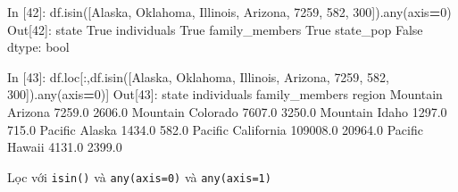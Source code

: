 \documentclass[
]{book}
\newenvironment{Shaded}{\begin{snugshade}}{\end{snugshade}}
\newcommand{\BuiltInTok}[1]{#1}
\newcommand{\DecValTok}[1]{\textcolor[rgb]{0.00,0.00,0.81}{#1}}
\newcommand{\FloatTok}[1]{\textcolor[rgb]{0.00,0.00,0.81}{#1}}
\newcommand{\NormalTok}[1]{#1}
\newcommand{\OperatorTok}[1]{\textcolor[rgb]{0.81,0.36,0.00}{\textbf{#1}}}
\newcommand{\StringTok}[1]{\textcolor[rgb]{0.31,0.60,0.02}{#1}}
\newcommand{\VariableTok}[1]{\textcolor[rgb]{0.00,0.00,0.00}{#1}}
\begin{document}
\begin{Shaded}
\begin{Highlighting}[]
\NormalTok{In [}\DecValTok{42}\NormalTok{]: df.isin([}\StringTok{\textquotesingle{}Alaska\textquotesingle{}}\NormalTok{, }\StringTok{\textquotesingle{}Oklahoma\textquotesingle{}}\NormalTok{, }\StringTok{\textquotesingle{}Illinois\textquotesingle{}}\NormalTok{, }\StringTok{\textquotesingle{}Arizona\textquotesingle{}}\NormalTok{, }\DecValTok{7259}\NormalTok{, }\DecValTok{582}\NormalTok{, }\DecValTok{300}\NormalTok{]).}\BuiltInTok{any}\NormalTok{(axis}\OperatorTok{=}\DecValTok{0}\NormalTok{)}
\NormalTok{Out[}\DecValTok{42}\NormalTok{]:}
\NormalTok{state              }\VariableTok{True}
\NormalTok{individuals        }\VariableTok{True}
\NormalTok{family\_members     }\VariableTok{True}
\NormalTok{state\_pop         }\VariableTok{False}
\NormalTok{dtype: }\BuiltInTok{bool}

\NormalTok{In [}\DecValTok{43}\NormalTok{]: df.loc[:,df.isin([}\StringTok{\textquotesingle{}Alaska\textquotesingle{}}\NormalTok{, }\StringTok{\textquotesingle{}Oklahoma\textquotesingle{}}\NormalTok{, }\StringTok{\textquotesingle{}Illinois\textquotesingle{}}\NormalTok{, }\StringTok{\textquotesingle{}Arizona\textquotesingle{}}\NormalTok{, }\DecValTok{7259}\NormalTok{, }\DecValTok{582}\NormalTok{, }\DecValTok{300}\NormalTok{]).}\BuiltInTok{any}\NormalTok{(axis}\OperatorTok{=}\DecValTok{0}\NormalTok{)]}
\NormalTok{Out[}\DecValTok{43}\NormalTok{]:}
\NormalTok{               state  individuals  family\_members}
\NormalTok{region                                           }
\NormalTok{Mountain     Arizona       }\FloatTok{7259.0}          \FloatTok{2606.0}
\NormalTok{Mountain    Colorado       }\FloatTok{7607.0}          \FloatTok{3250.0}
\NormalTok{Mountain       Idaho       }\FloatTok{1297.0}           \FloatTok{715.0}
\NormalTok{Pacific       Alaska       }\FloatTok{1434.0}           \FloatTok{582.0}
\NormalTok{Pacific   California     }\FloatTok{109008.0}         \FloatTok{20964.0}
\NormalTok{Pacific       Hawaii       }\FloatTok{4131.0}          \FloatTok{2399.0}
\end{Highlighting}
\end{Shaded}

Lọc với \texttt{isin()} và \texttt{any(axis=0)} và \texttt{any(axis=1)}
\end{document}
